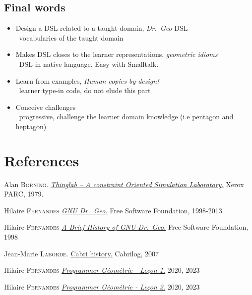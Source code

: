 \documentclass{beamer}
\newcommand{\tip}{\boldmath{\textcolor{red}{$\Rightarrow$}}}
\newcommand{\drgeo}{Dr.~Geo}
\begin{document}
\subsection{Final words}
\begin{frame}
  \begin{spacing}{1.5}
  \begin{itemize}
  \item Design a DSL related to a taught domain, \emph{\drgeo} DSL \\
    \tip\ vocabularies of the taught domain
  \item Makes DSL closes to the learner representations, \emph{geometric idioms} \\
    \tip\ DSL in \alert{native language}. Easy with Smalltalk.
  \item Learn from examples, \emph{Human copies by-design!} \\
    \tip\ learner type-in code, do not elude this part
  \item Conceive challenges \\
    \tip\ progressive, challenge the learner domain
    knowledge (i.e pentagon and heptagon)
\end{itemize}
\end{spacing}

  
\end{frame}
\section{References}
\begin{frame}
  \fontsize{10pt}{8pt}\selectfont
  \begin{thebibliography}{99}

    Alan \textsc{Borning}.
    \href{http://esug.org/data/HistoricalDocuments/ThingLab/ThingLab-index.html}{\emph{Thinglab -- A constraint Oriented Simulation Laboratory.}} Xerox PARC, 1979.

    Hilaire \textsc{Fernandes}
    \href{https://www.gnu.org/software/dr-geo/}{\emph{GNU \drgeo.}} Free Software Foundation, 1998-2013
    
    Hilaire \textsc{Fernandes}
    \href{https://www.gnu.org/software/dr-geo/a_brief_history_of_GNU_DrGeo.html}{\emph{A Brief History of GNU \drgeo.}} Free Software Foundation, 1998
    
    Jean-Marie \textsc{Laborde}.
    \href{http://www.cabri.net/cabri2/historique-e.php}{Cabri history.} Cabrilog, 2007

    Hilaire \textsc{Fernandes}
    \href{https://gnu-drgeo.blogspot.com/2023/10/programmer-geometrie-lecon-1.html}{\emph{Programmer Géométrie - Leçon 1.}} 2020, 2023

    Hilaire \textsc{Fernandes}
    \href{https://gnu-drgeo.blogspot.com/2023/10/programmer-geometrie-lecon-2.html}{\emph{Programmer Géométrie - Leçon 2.}} 2020, 2023

    
  \end{thebibliography}
\end{frame}
\end{document}
